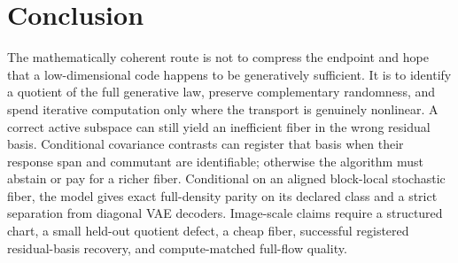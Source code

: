 \section{Conclusion}

The mathematically coherent route is not to compress the endpoint and hope that a low-dimensional code happens to be generatively sufficient.  It is to identify a quotient of the full generative law, preserve complementary randomness, and spend iterative computation only where the transport is genuinely nonlinear.  A correct active subspace can still yield an inefficient fiber in the wrong residual basis.  Conditional covariance contrasts can register that basis when their response span and commutant are identifiable; otherwise the algorithm must abstain or pay for a richer fiber.  Conditional on an aligned block-local stochastic fiber, the model gives exact full-density parity on its declared class and a strict separation from diagonal VAE decoders.  Image-scale claims require a structured chart, a small held-out quotient defect, a cheap fiber, successful registered residual-basis recovery, and compute-matched full-flow quality.
